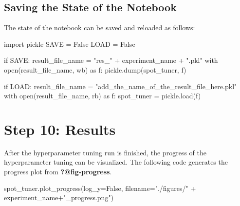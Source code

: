 \documentclass[
  letterpaper,
  DIV=11,
  numbers=noendperiod]{scrreprt}
\newenvironment{Shaded}{\begin{snugshade}}{\end{snugshade}}
\newcommand{\BuiltInTok}[1]{\textcolor[rgb]{0.00,0.23,0.31}{#1}}
\newcommand{\ControlFlowTok}[1]{\textcolor[rgb]{0.00,0.23,0.31}{#1}}
\newcommand{\ImportTok}[1]{\textcolor[rgb]{0.00,0.46,0.62}{#1}}
\newcommand{\NormalTok}[1]{\textcolor[rgb]{0.00,0.23,0.31}{#1}}
\newcommand{\OperatorTok}[1]{\textcolor[rgb]{0.37,0.37,0.37}{#1}}
\newcommand{\StringTok}[1]{\textcolor[rgb]{0.13,0.47,0.30}{#1}}
\newcommand{\VariableTok}[1]{\textcolor[rgb]{0.07,0.07,0.07}{#1}}
\begin{document}
\hypertarget{sec-saving-the-state-of-the-notebook}{%
\subsection{Saving the State of the
Notebook}\label{sec-saving-the-state-of-the-notebook}}

The state of the notebook can be saved and reloaded as follows:

\begin{Shaded}
\begin{Highlighting}[]
\ImportTok{import}\NormalTok{ pickle}
\NormalTok{SAVE }\OperatorTok{=} \VariableTok{False}
\NormalTok{LOAD }\OperatorTok{=} \VariableTok{False}

\ControlFlowTok{if}\NormalTok{ SAVE:}
\NormalTok{    result\_file\_name }\OperatorTok{=} \StringTok{"res\_"} \OperatorTok{+}\NormalTok{ experiment\_name }\OperatorTok{+} \StringTok{".pkl"}
    \ControlFlowTok{with} \BuiltInTok{open}\NormalTok{(result\_file\_name, }\StringTok{\textquotesingle{}wb\textquotesingle{}}\NormalTok{) }\ImportTok{as}\NormalTok{ f:}
\NormalTok{        pickle.dump(spot\_tuner, f)}

\ControlFlowTok{if}\NormalTok{ LOAD:}
\NormalTok{    result\_file\_name }\OperatorTok{=} \StringTok{"add\_the\_name\_of\_the\_result\_file\_here.pkl"}
    \ControlFlowTok{with} \BuiltInTok{open}\NormalTok{(result\_file\_name, }\StringTok{\textquotesingle{}rb\textquotesingle{}}\NormalTok{) }\ImportTok{as}\NormalTok{ f:}
\NormalTok{        spot\_tuner }\OperatorTok{=}\NormalTok{  pickle.load(f)}
\end{Highlighting}
\end{Shaded}

\hypertarget{sec-results-14}{%
\section{Step 10: Results}\label{sec-results-14}}

After the hyperparameter tuning run is finished, the progress of the
hyperparameter tuning can be visualized. The following code generates
the progress plot from \textbf{?@fig-progress}.

\begin{Shaded}
\begin{Highlighting}[]
\NormalTok{spot\_tuner.plot\_progress(log\_y}\OperatorTok{=}\VariableTok{False}\NormalTok{, }
\NormalTok{    filename}\OperatorTok{=}\StringTok{"./figures/"} \OperatorTok{+}\NormalTok{ experiment\_name}\OperatorTok{+}\StringTok{"\_progress.png"}\NormalTok{)}
\end{Highlighting}
\end{Shaded}
\end{document}
